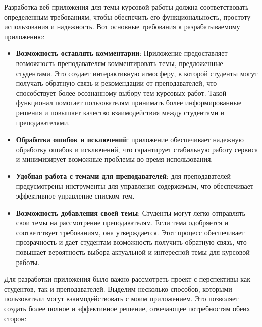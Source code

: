 \documentclass[14pt]{extarticle} %
\begin{document}

Разработка веб-приложения для темы курсовой работы должна соответствовать определенным требованиям, чтобы обеспечить его функциональность, простоту использования и надежность. Вот основные требования к разрабатываемому приложению:

\begin{itemize}
    \item \textbf{Возможность оставлять комментарии}: 
Приложение предоставляет возможность преподавателям комментировать темы, предложенные студентами. Это создает интерактивную атмосферу, в которой студенты могут получать обратную связь и рекомендации от преподавателей, что способствует более осознанному выбору тем курсовых работ. Такой функционал помогает пользователям принимать более информированные решения и повышает качество взаимодействия между студентами и преподавателями.
    \item \textbf{Обработка ошибок и исключений}: приложение обеспечивает надежную обработку ошибок и исключений, что гарантирует стабильную работу сервиса и минимизирует возможные проблемы во время использования.
    \item \textbf{Удобная работа с темами для преподавателей}: для преподавателей предусмотрены инструменты для управления содержимым, что обеспечивает эффективное управление списком тем.
    \item \textbf{Возможность добавления своей темы}: Студенты могут легко отправлять свои темы на рассмотрение преподавателям. Если тема одобряется и соответствует требованиям, она утверждается. Этот процесс обеспечивает прозрачность и дает студентам возможность получить обратную связь, что повышает вероятность выбора актуальной и интересной темы для курсовой работы.
\end{itemize}


Для разработки приложения было важно рассмотреть проект с перспективы как студентов, так и преподавателей. Выделим несколько способов, которыми пользователи могут взаимодействовать с моим приложением. Это позволяет создать более полное и эффективное решение, отвечающее потребностям обеих сторон:
\end{document}
